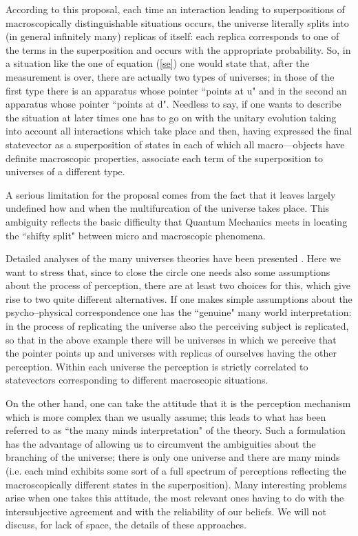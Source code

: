 \documentclass[10pt,a4paper]{article}
\begin{document}
According to this proposal, each time an interaction leading to
superpositions of macroscopically distinguishable situations
occurs, the universe literally splits into (in general infinitely
many) replicas of itself: each replica corresponds to one of the
terms in the superposition and occurs with the appropriate
probability. So, in a situation like the one of equation
(\ref{se}) one would state that, after the measurement is over,
there are actually two types of universes; in those of the first
type there is an apparatus whose pointer ``points at u" and in the
second an apparatus whose pointer ``points at d". Needless to say,
if one wants to describe the situation at later times one has to
go on with the unitary evolution taking into account all
interactions which take place and then, having expressed the final
statevector as a superposition of states in each of which all
macro---objects have definite macroscopic properties, associate
each term of the superposition to universes of a different type.

A serious limitation for the proposal comes from the fact that it
leaves largely undefined how and when the multifurcation of the
universe takes place. This ambiguity reflects the basic difficulty
that Quantum Mechanics meets in locating the ``shifty split"
between micro and macroscopic phenomena.

Detailed analyses of the many universes theories have been
presented \cite{de1,al7,al5}. Here we want to stress that, since
to close the circle one needs also some assumptions about the
process of perception, there are at least two choices for this,
which give rise to two quite different alternatives. If one makes
simple assumptions about the psycho--physical correspondence one
has the ``genuine" many world interpretation: in the process of
replicating the universe also the perceiving subject is
replicated, so that in the above example there will be universes
in which we perceive that the pointer points up and universes with
replicas of ourselves having the other perception. Within each
universe the perception is strictly correlated to statevectors
corresponding to different macroscopic situations.

On the other hand, one can take the attitude that it is the
perception mechanism which is more complex than we usually assume;
this leads to what has been referred to as ``the many minds
interpretation" of the theory. Such a formulation has the
advantage of allowing us to circumvent the ambiguities about the
branching of the universe; there is only one universe and there
are many minds (i.e. each mind exhibits some sort of a full
spectrum of perceptions reflecting the macroscopically different
states in the superposition). Many interesting problems arise when
one takes this attitude, the most relevant ones having to do with
the intersubjective agreement and with the reliability of our
beliefs. We will not discuss, for lack of space, the details of
these approaches.
\end{document}
